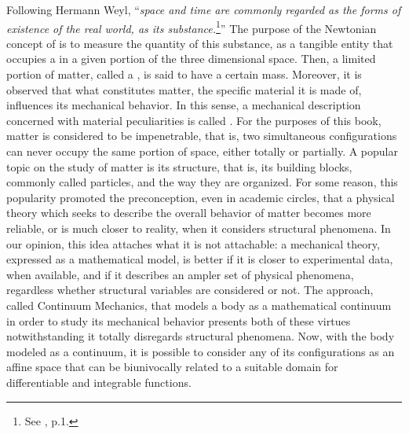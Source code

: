 Following Hermann Weyl, ``\emph{space and time are commonly regarded as the forms of existence of the real world,  as its substance.}\footnote{See \cite{weyl_1952_2}, p.1.}'' The purpose of the Newtonian concept of  is to measure the quantity of this substance, as a tangible entity that occupies a  in a given portion of the three dimensional space. Then, a limited portion of matter, called a , is said to have a certain mass. Moreover, it is observed that what constitutes matter, the specific material it is made of, influences its mechanical behavior. In this sense, a mechanical description concerned with material peculiarities is called . For the purposes of this book, matter is considered to be impenetrable, that is, two simultaneous configurations can never occupy the same portion of space, either totally or partially. A popular topic on the study of matter is its structure, that is, its building blocks, commonly called particles, and the way they are organized. For some reason, this popularity promoted the preconception, even in academic circles, that a physical theory which seeks to describe the overall behavior of matter becomes more reliable, or is much closer to reality, when it considers structural phenomena. In our opinion, this idea attaches what it is not attachable: a mechanical theory, expressed as a mathematical model, is better if it is closer to experimental data, when available, and if it describes an ampler set of physical phenomena, regardless whether structural variables are considered or not. The approach, called Continuum Mechanics, that models a body as a mathematical continuum in order to study its mechanical behavior presents both of these virtues notwithstanding it totally disregards structural phenomena. Now, with the body modeled as a continuum, it is possible to consider any of its configurations as an affine space that can be biunivocally related to a suitable domain for differentiable and integrable functions.


